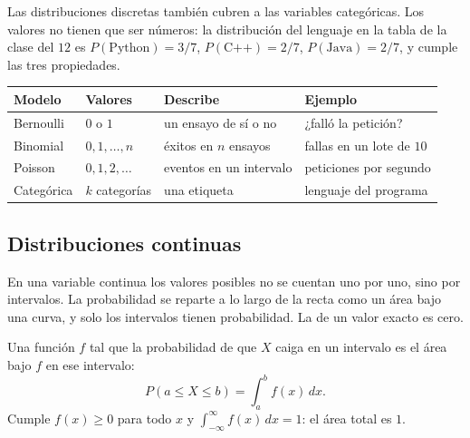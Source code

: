 \documentclass[11pt,letterpaper]{article}
\begin{document}
Las distribuciones discretas también cubren a las variables
categóricas. Los valores no tienen que ser números: la distribución
del lenguaje en la tabla de la clase del $12$ es
$P(\text{Python}) = 3/7$, $P(\text{C++}) = 2/7$,
$P(\text{Java}) = 2/7$, y cumple las tres propiedades.

\begin{center}
\small
\begin{tabular}{llll}
    \toprule
    \textbf{Modelo} & \textbf{Valores} & \textbf{Describe}
    & \textbf{Ejemplo} \\
    \midrule
    Bernoulli  & $0$ o $1$           & un ensayo de sí o no
               & ¿falló la petición? \\
    Binomial   & $0, 1, \ldots, n$   & éxitos en $n$ ensayos
               & fallas en un lote de $10$ \\
    Poisson    & $0, 1, 2, \ldots$   & eventos en un intervalo
               & peticiones por segundo \\
    Categórica & $k$ categorías      & una etiqueta
               & lenguaje del programa \\
    \bottomrule
\end{tabular}
\end{center}


\subsection*{Distribuciones continuas}

En una variable continua los valores posibles no se cuentan uno por
uno, sino por intervalos. La probabilidad se reparte a lo largo de la
recta como un área bajo una curva, y solo los intervalos tienen
probabilidad. La de un valor exacto es cero.

\begin{definicion}
    Una función $f$ tal que la probabilidad de que $X$ caiga en un
    intervalo es el área bajo $f$ en ese intervalo:
    \[
        P(a \le X \le b) = \int_{a}^{b} f(x)\, dx .
    \]
    Cumple $f(x) \ge 0$ para todo $x$ y
    $\int_{-\infty}^{\infty} f(x)\, dx = 1$: el área total es $1$.
\end{definicion}
\end{document}
